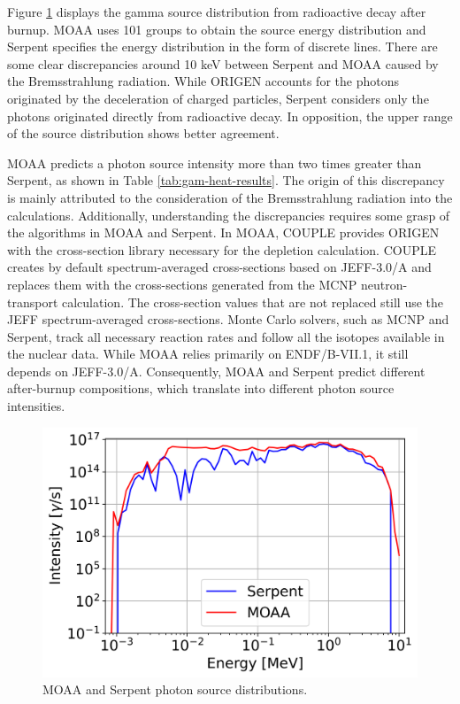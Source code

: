 Figure \ref{fig:g-source} displays the gamma source distribution from radioactive decay after burnup.
MOAA uses 101 groups to obtain the source energy distribution and Serpent specifies the energy distribution in the form of discrete lines.
There are some clear discrepancies around 10 keV between Serpent and MOAA caused by the Bremsstrahlung radiation.
While ORIGEN accounts for the photons originated by the deceleration of charged particles, Serpent considers only the photons originated directly from radioactive decay.
In opposition, the upper range of the source distribution shows better agreement.

MOAA predicts a photon source intensity more than two times greater than Serpent, as shown in Table \ref{tab:gam-heat-results}.
The origin of this discrepancy is mainly attributed to the consideration of the Bremsstrahlung radiation into the calculations.
Additionally, understanding the discrepancies requires some grasp of the algorithms in MOAA and Serpent.
In MOAA, COUPLE provides ORIGEN with the cross-section library necessary for the depletion calculation.
COUPLE creates by default spectrum-averaged cross-sections based on JEFF-3.0/A and replaces them with the cross-sections generated from the MCNP neutron-transport calculation.
The cross-section values that are not replaced still use the JEFF spectrum-averaged cross-sections.
Monte Carlo solvers, such as MCNP and Serpent, track all necessary reaction rates and follow all the isotopes available in the nuclear data.
While MOAA relies primarily on ENDF/B-VII.1, it still depends on JEFF-3.0/A.
Consequently, MOAA and Serpent predict different after-burnup compositions, which translate into different photon source intensities.

\begin{figure}[htbp!] %
    \centering
    \includegraphics[width=0.6\linewidth]{figures/g-source.png}
    \hfill
    \caption{MOAA and Serpent photon source distributions.}
    \label{fig:g-source}
\end{figure}

